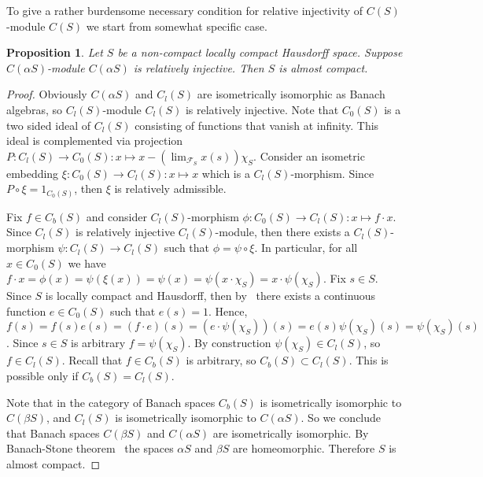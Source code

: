 \documentclass[12pt]{article}
\newtheorem{proposition}[theorem]{Proposition}
\begin{document}
To give a rather burdensome necessary condition for relative injectivity of
$C(S)$-module $C(S)$ we start from somewhat specific case.

\begin{proposition}\label{RelInjCaSModCaSImplSAlmComp} Let $S$ be a non-compact
    locally compact Hausdorff space. Suppose $C(\alpha S)$-module $C(\alpha S)$
    is relatively injective. Then $S$ is almost compact.
\end{proposition}
\begin{proof} Obviously $C(\alpha S)$ and $C_l(S)$ are isometrically isomorphic
    as Banach algebras, so $C_l(S)$-module $C_l(S)$ is relatively injective.
    Note that $C_0(S)$ is a two sided ideal of $C_l(S)$ consisting of functions
    that vanish at infinity. This ideal is complemented via projection
    $P:C_l(S)\to C_0(S):x\mapsto x-(\lim_{\mathcal{F}_S}x(s))\chi_{S}$. Consider
    an isometric embedding $\xi:C_0(S)\to C_l(S):x\mapsto x$ which is a
    $C_l(S)$-morphism. Since $P\circ\xi=1_{C_0(S)}$, then $\xi$ is relatively
    admissible.

    Fix $f \in C_b(S)$ and consider $C_l(S)$-morphism $\phi:C_0(S)\to
        C_l(S):x\mapsto f \cdot x$. Since $C_l(S)$ is relatively injective
    $C_l(S)$-module, then there exists a $C_l(S)$-morphism $\psi:C_l(S)\to
        C_l(S)$ such that $\phi=\psi\circ\xi$. In particular, for all $x\in
        C_0(S)$ we have $f\cdot x=\phi(x)=\psi(\xi(x))=\psi(x)=\psi(x\cdot
        \chi_{S})=x\cdot \psi(\chi_{S})$. Fix $s\in S$. Since $S$ is locally
    compact and Hausdorff, then by~\cite[corollary 3.3.3]{EngkingGenTop}
    there exists a continuous function $e\in C_0(S)$ such that $e(s)=1$.
    Hence, $f(s)=f(s)e(s)=(f\cdot
        e)(s)=(e\cdot\psi(\chi_{S}))(s)=e(s)\psi(\chi_{S})(s)=\psi(\chi_{S})(s)$.
    Since $s\in S$ is arbitrary $f=\psi(\chi_{S})$. By construction
    $\psi(\chi_S)\in C_l(S)$, so $f\in C_l(S)$. Recall that $f\in C_b(S)$ is
    arbitrary, so $C_b(S)\subset C_l(S)$. This is possible only if
    $C_b(S)=C_l(S)$.

    Note that in the category of Banach spaces $C_b(S)$ is isometrically
    isomorphic to $C(\beta S)$, and $C_l(S)$ is isometrically isomorphic to
    $C(\alpha S)$. So we conclude that Banach spaces $C(\beta S)$ and $C(\alpha
        S)$ are isometrically isomorphic. By Banach-Stone theorem~\cite[theorem
        83]{StoneBanStAppBoolRngToTop} the spaces $\alpha S$ and $\beta S$ are
    homeomorphic. Therefore $S$ is almost compact.
\end{proof}
\end{document}
